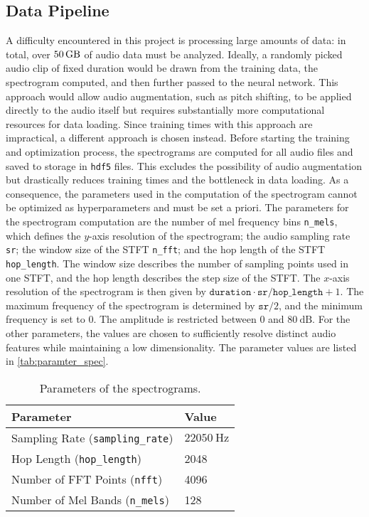 \subsection{Data Pipeline}
A difficulty encountered in this project is processing large amounts of data: in total, over $\qty{50}{\giga\byte}$ of audio data must be analyzed. 
Ideally, a randomly picked audio clip of fixed duration would be drawn from the training data, the spectrogram computed, and then further passed to the neural network. 
This approach would allow audio augmentation, such as pitch shifting, to be applied directly to the audio itself but requires substantially more computational resources for data loading. 
Since training times with this approach are impractical, a different approach is chosen instead. Before starting the training and optimization process, 
the spectrograms are computed for all audio files and saved to storage in \texttt{hdf5} files. This excludes the possibility of audio augmentation 
but drastically reduces training times and the bottleneck in data loading. As a consequence, the parameters used in the computation of the spectrogram cannot be optimized 
as hyperparameters and must be set a priori. The parameters for the spectrogram computation are the number of mel frequency bins \texttt{n\_mels}, which defines the $y$-axis 
resolution of the spectrogram; the audio sampling rate \texttt{sr}; the window size of the STFT \texttt{n\_fft}; and the hop length of the STFT \texttt{hop\_length}. 
The window size describes the number of sampling points used in one STFT, and the hop length describes the step size of the STFT. 
The $x$-axis resolution of the spectrogram is then given by $\texttt{duration} \cdot \texttt{sr}/\texttt{hop\_length} + 1$. 
The maximum frequency of the spectrogram is determined by $\texttt{sr}/2$, and the minimum frequency is set to $\num{0}$. The amplitude is restricted between $\num{0}$ and 
$\qty{80}{\deci\bel}$. For the other parameters, the values are chosen to sufficiently resolve distinct audio features while maintaining a low dimensionality. 
The parameter values are listed in \autoref{tab:paramter_spec}.
\begin{table}[h]
    \centering
    \caption{Parameters of the spectrograms.}
    \label{tab:paramter_spec}
    \begin{tabular}{ll}
        \toprule
        \small
        \textbf{Parameter} & \textbf{Value} \\
        \midrule
        Sampling Rate (\texttt{sampling\_rate}) & $\qty{22050}{\hertz}$ \\
        Hop Length (\texttt{hop\_length}) & 2048 \\
        Number of FFT Points (\texttt{nfft}) & 4096 \\
        Number of Mel Bands (\texttt{n\_mels}) & 128 \\
        \bottomrule
    \end{tabular}
\end{table}
